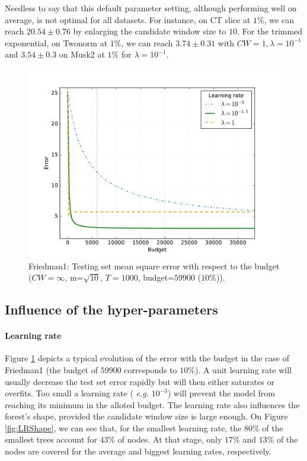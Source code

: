 \documentclass{article}
\begin{document}
Needless to say that this default parameter setting, although performing well 
on average, is not optimal for all datasets. For instance, on CT slice at 
$1\%$, we can reach $20.54 \pm 0.76$ by enlarging the candidate window size 
to $10$. 
For the trimmed exponential, on Twonorm at $1\%$, we can reach $3.74 \pm
0.31$ with $CW=1, \lambda=10^{-1}$ and $3.54 \pm 0.3$ on Musk2 at $1\%$ for 
$\lambda=10^{-1}$.


\begin{figure}[ht]
\begin{center}
\centerline{\includegraphics[width=\columnwidth]{friedman1_lr}}
\caption{Friedman1: Testing set mean square error with respect to the budget 
($CW=\infty$, m=$\sqrt{10}$, $T=1000$, budget=$59900$ ($10\%$)).}
\label{fig:learningRate}
\end{center}
\vskip -0.2in
\end{figure} 

\subsection{Influence of the hyper-parameters}

\paragraph{Learning rate}
Figure \ref{fig:learningRate} depicts a typical evolution of the error with the 
budget in the case of Friedman1 (the budget of $59900$ corresponds to $10\%$). 
A unit learning rate will usually decrease the test set error rapidly 
but will then either saturates or overfits. Too small a learning rate ({\it 
e.g.} $10^{-3}$) will prevent the model from reaching its minimum in the 
alloted budget.  The learning rate also influences the forest's shape, provided 
the candidate window size is large enough. On Figure \ref{fig:LRShape}, we can 
see that, for the smallest learning rate, the $80\%$ of the smallest trees 
account for $43\%$ of nodes. At that stage, only $17\%$ and $13\%$ of the nodes 
are covered for the average and biggest learning rates, respectively.
\end{document}
